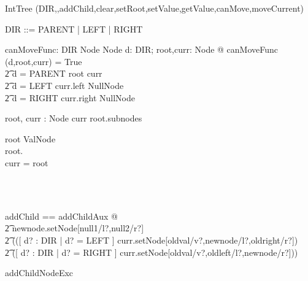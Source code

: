 \begin{class}{IntTree}
\visibility (DIR,\Init,addChild,clear,setRoot,setValue,getValue,canMove,moveCurrent) \\
\begin{zed}
DIR ::= PARENT | LEFT | RIGHT
\end{zed}
\begin{axdef}
	canMoveFunc: DIR \cross Node \cross Node \fun \bool
\where
	\forall d: DIR; root,curr: Node @ canMoveFunc (d,root,curr) = True \iff \\
		\t2 d = PARENT \land root \neq curr \lor \\
		\t2 d = LEFT \land curr.left \notin NullNode \lor \\
		\t2 d = RIGHT \land curr.right \notin NullNode
\end{axdef}
\begin{state}
	root, curr : Node
\where
	curr \in root.subnodes
\end{state}
\begin{init}
	root \in ValNode \\
        root.\Init \\
        curr = root
\end{init}\\
\\
addChild == addChildAux @ \\
	\t2 newnode.setNode[null1/l?,null2/r?] \land \\
	\t2 (([ d? : DIR | d? = LEFT ]
		\land curr.setNode[oldval/v?,newnode/l?,oldright/r?]) \gch \\
	\t2 ([ d? : DIR | d? = RIGHT ]
		\land curr.setNode[oldval/v?,oldleft/l?,newnode/r?]))\\
\begin{schema}{addChildNodeExc}

\end{schema}
\end{class}
